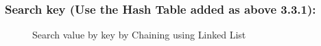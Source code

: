 \subsubsection{Search key (Use the Hash Table added as above 3.3.1):}
\begin{figure}[H]
	\centering
	\qquad
	\caption{Search value by key by Chaining using Linked List}%
\end{figure}

